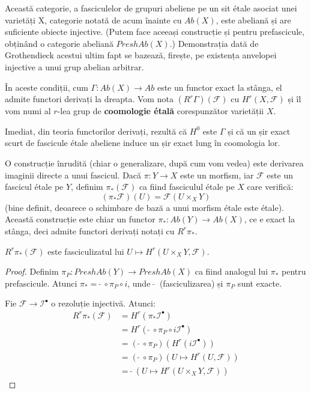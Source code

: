 \documentclass[13pt,openany]{book}
\begin{document}
Această categorie, a fasciculelor de grupuri abeliene pe un sit étale asociat unei varietăți X, categorie notată de acum înainte cu $Ab(X)$, este abeliană și are suficiente obiecte injective. (Putem face aceeași construcție și pentru prefascicule, obținând o categorie abeliană $PreshAb(X)$.) Demonstrația dată de Grothendieck acestui ultim fapt se bazează, firește, pe existența anvelopei injective a unui grup abelian arbitrar.

În aceste condiții, cum $\Gamma: Ab(X) \rightarrow Ab$ este un functor exact la stânga, el admite functori derivați la dreapta. Vom nota $(R^r\Gamma)(\mathcal{F})$ cu $H^r(X,\mathcal{F})$ și îl vom numi al $r$-lea grup de {\bf coomologie étală} corespunzător varietății $X$.

Imediat, din teoria functorilor derivați, rezultă că $H^0$ este $\Gamma$ și că un șir exact scurt de fascicule étale abeliene induce un șir exact lung în coomologia lor.

O construcție înrudită (chiar o generalizare, după cum vom vedea) este derivarea imaginii directe a unui fascicul. Dacă $\pi: Y \rightarrow X$ este un morfism, iar $\mathcal{F}$ este un fascicul étale pe $Y$, definim $\pi_*(\mathcal{F})$ ca fiind fasciculul étale pe $X$ care verifică:
$$(\pi_*\mathcal{F})(U)=\mathcal{F}(U\times_X Y)$$
(bine definit, deoarece o schimbare de bază a unui morfism étale este étale). Această construcție este chiar un functor $\pi_*: Ab(Y) \rightarrow Ab(X)$, ce e exact la stânga, deci admite functori derivați notați cu $R^r\pi_*$.

\begin{prop}
$R^r\pi_*(\mathcal{F})$ este fasciculizatul lui $U \mapsto H^r(U \times_X Y, \mathcal{F})$.
\end{prop}

\begin{proof}
Definim $\pi_P: PreshAb(Y) \rightarrow PreshAb(X)$ ca fiind analogul lui $\pi_*$ pentru prefascicule. Atunci $\pi_* =\  \widetilde{}\ \circ \pi_P \circ i$, unde $\ \widetilde{}\ $ (fasciculizarea) și $\pi_P$ sunt exacte.

Fie $\mathcal{F} \rightarrow \mathcal{I}^\bullet$ o rezoluție injectivă. Atunci:
\begin{align*}
R^r\pi_*(\mathcal{F}) &= H^r(\pi_*\mathcal{I}^\bullet)\\
&= H^r (\ \widetilde{}\ \circ \pi_P \circ i\mathcal{I}^\bullet)\\
&= (\ \widetilde{}\ \circ \pi_P)(H^r(i\mathcal{I}^\bullet))\\
&=(\ \widetilde{}\ \circ \pi_P)(U \mapsto H^r(U, \mathcal{F}))\\
&=\ \widetilde{}\ (U \mapsto H^r(U \times_X Y, \mathcal{F}))
\end{align*}
\end{proof}
\end{document}
